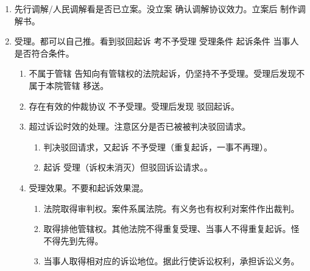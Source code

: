 \begin{enumerate}
\begin{enumerate}
\begin{enumerate}
                  \item 3 个会一起考的文书。裁定不予受理、裁定驳回起诉、判决驳回诉讼请求（败诉）。
                \end{enumerate}
          \item 起诉效果。仅一个时效中断。
          \item 起诉状。可口头、可书面。
                \begin{enumerate}
                  \item 内容就 4 样。当事人的有关情况、诉讼请求、事实和理由、证据相关。
                  \item 没有案由（案件进行分类）这个东西。
                \end{enumerate}
        \end{enumerate}
  \item 先行调解/人民调解看是否已立案。\yi 没立案 \yjt 确认调解协议效力。\er 立案后 \yjt 制作调解书。
  \item 受理。都可以自己推。看到驳回起诉 \yjt 考不予受理 \yjt 受理条件 \yjt 起诉条件 \yjt 当事人是否符合条件。
        \begin{enumerate}
          \item \yi 不属于管辖 \yjt 告知向有管辖权的法院起诉，仍坚持不予受理。\er 受理后发现不属于本院管辖 \yjt 移送。
          \item 存在有效的仲裁协议 \yjt 不予受理。受理后发现 \yjt 驳回起诉。
          \item 超过诉讼时效的处理。注意区分是否已被被判决驳回请求。
                \begin{enumerate}
                  \item 判决驳回请求，又起诉 \yjt 不予受理（重复起诉，一事不再理）。
                  \item 起诉 \yjt 受理（诉权未消灭）但驳回诉讼请求。。
                \end{enumerate}
          \item 受理效果。不要和起诉效果混。
                \begin{enumerate}
                  \item 法院取得审判权。案件系属法院。有义务也有权利对案件作出裁判。
                  \item 取得排他管辖权。其他法院不得重复受理、当事人不得重复起诉。怪不得先到先得。
                  \item 当事人取得相对应的诉讼地位。据此行使诉讼权利，承担诉讼义务。
                \end{enumerate}
        \end{enumerate}

\end{enumerate}
